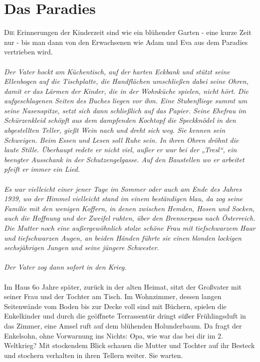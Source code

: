 \chapter{Das Paradies}
\lettrine{D}{ie} Erinnerungen der Kinderzeit sind wie ein blühender Garten - eine kurze Zeit nur - bis man dann von den Erwachsenen wie Adam und Eva aus dem Paradies vertrieben wird. \\\\
\textit{Der Vater hockt am Küchentisch, auf der harten Eckbank und stützt seine Ellenbogen auf die Tischplatte, die Handflächen umschließen dabei seine Ohren, damit er das Lärmen der Kinder, die in der Wohnküche spielen, nicht hört. Die aufgeschlagenen Seiten des Buches liegen vor ihm. Eine Stubenfliege summt um seine Nasenspitze, setzt sich dann schließlich auf das Papier. Seine Ehefrau im Schürzenkleid schöpft aus dem dampfenden Kochtopf die Speckknödel in den abgestellten Teller, gießt Wein nach und dreht sich weg. Sie kennen sein Schweigen. Beim Essen und Lesen soll Ruhe sein. In ihren Ohren dröhnt die laute Stille. Überhaupt redete er nicht viel, außer er war bei der „Tresl“, ein beengter Ausschank in der Schutzengelgasse. Auf den Baustellen wo er arbeitet pfeift er immer ein Lied.\\\\
Es war vielleicht einer jener Tage im Sommer oder auch am Ende des Jahres 1939, wo der Himmel vielleicht stand im einem beständigen blau, da zog seine Familie mit den wenigen Koffern, in denen zwischen Hemden, Hosen und Socken, auch die Hoffnung und der Zweifel ruhten, über den Brennerpass nach Österreich. Die Mutter noch eine außergewöhnlich stolze schöne Frau mit tiefschwarzem Haar und tiefschwarzen Augen, an beiden Händen führte sie einen blonden lockigen sechsjährigen Jungen und seine jüngere Schwester.\\\\
Der Vater zog dann sofort in den Krieg.\\\\}
Im Haus 6o Jahre später, zurück in der alten Heimat, sitzt der Großvater mit seiner Frau und der Tochter am Tisch. Im Wohnzimmer, dessen langen Seitenwände vom Boden bis zur Decke voll sind mit Büchern, spielen die Enkelkinder und durch die geöffnete Terrassentür dringt süßer Frühlingsduft in das Zimmer, eine Amsel ruft auf dem blühenden Holunderbaum. Da fragt der Enkelsohn, ohne Vorwarnung ins Nichts: Opa, wie war das bei dir im 2. Weltkrieg? Mit stockendem Blick schauen die Mutter und Tochter auf ihr Besteck und stochern verhalten in ihren Tellern weiter. Sie warten.\\\\
